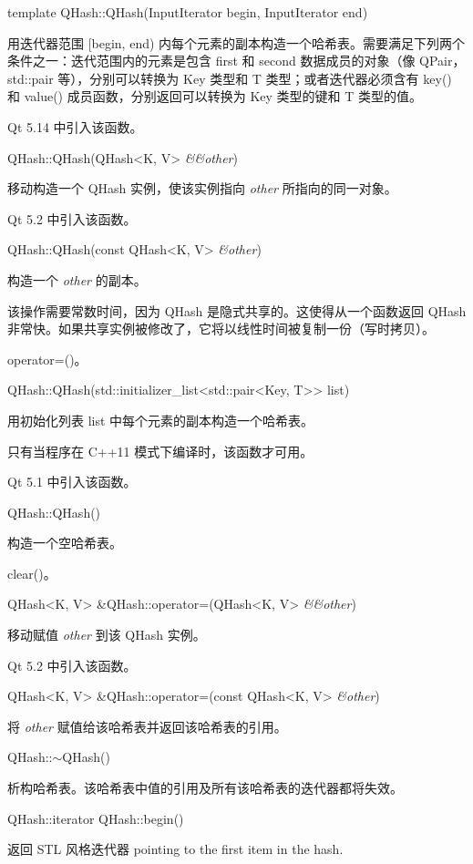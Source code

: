 template QHash::QHash(InputIterator begin, InputIterator end)

用迭代器范围 [begin, end) 内每个元素的副本构造一个哈希表。需要满足下列两个条件之一：迭代范围内的元素是包含 first 和 second 数据成员的对象（像 QPair，std::pair 等），分别可以转换为 Key 类型和 T 类型；或者迭代器必须含有 key() 和 value() 成员函数，分别返回可以转换为 Key 类型的键和 T 类型的值。

Qt 5.14 中引入该函数。

QHash::QHash(QHash<K, V> \emph{\&\&other})

移动构造一个 QHash 实例，使该实例指向 \emph{other} 所指向的同一对象。

Qt 5.2 中引入该函数。

QHash::QHash(const QHash<K, V> \emph{\&other})

构造一个 \emph{other} 的副本。

该操作需要常数时间，因为 QHash 是隐式共享的。这使得从一个函数返回 QHash 非常快。如果共享实例被修改了，它将以线性时间被复制一份（写时拷贝）。

\begin{notice}[另请参阅]
operator=()。
\end{notice}


QHash::QHash(std::initializer\_list<std::pair<Key, T>> list)

用初始化列表 list 中每个元素的副本构造一个哈希表。

只有当程序在 C++11 模式下编译时，该函数才可用。

Qt 5.1 中引入该函数。

QHash::QHash()

构造一个空哈希表。

\begin{notice}[另请参阅]
clear()。
\end{notice}


QHash<K, V> \&QHash::operator=(QHash<K, V> \emph{\&\&other})

移动赋值 \emph{other} 到该 QHash 实例。

Qt 5.2 中引入该函数。

QHash<K, V> \&QHash::operator=(const QHash<K, V> \emph{\&other})

将 \emph{other} 赋值给该哈希表并返回该哈希表的引用。

QHash::$\sim$QHash()

析构哈希表。该哈希表中值的引用及所有该哈希表的迭代器都将失效。

QHash::iterator QHash::begin()

返回 STL 风格迭代器 pointing to the first item in the hash.

